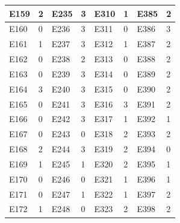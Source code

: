 \documentclass[UTF8]{ctexart}
\begin{document}
\begin{table}[H]
\begin{tabular}{|l|l|l|l|l|l|l|l|}
			E159 & 2 & E235 & 3 & E310 & 1 & E385 & 2 \\ \hline
			E160 & 0 & E236 & 3 & E311 & 0 & E386 & 3 \\ \hline
			E161 & 1 & E237 & 3 & E312 & 1 & E387 & 2 \\ \hline
			E162 & 0 & E238 & 2 & E313 & 0 & E388 & 2 \\ \hline
			E163 & 0 & E239 & 3 & E314 & 0 & E389 & 2 \\ \hline
			E164 & 3 & E240 & 3 & E315 & 0 & E390 & 2 \\ \hline
			E165 & 0 & E241 & 3 & E316 & 3 & E391 & 2 \\ \hline
			E166 & 0 & E242 & 3 & E317 & 1 & E392 & 1 \\ \hline
			E167 & 0 & E243 & 0 & E318 & 2 & E393 & 2 \\ \hline
			E168 & 2 & E244 & 3 & E319 & 2 & E394 & 0 \\ \hline
			E169 & 1 & E245 & 1 & E320 & 2 & E395 & 1 \\ \hline
			E170 & 0 & E246 & 0 & E321 & 1 & E396 & 1 \\ \hline
			E171 & 0 & E247 & 1 & E322 & 1 & E397 & 2 \\ \hline
			E172 & 1 & E248 & 0 & E323 & 2 & E398 & 2 \\ \hline
		\end{tabular}
	\end{table}
\end{document}
